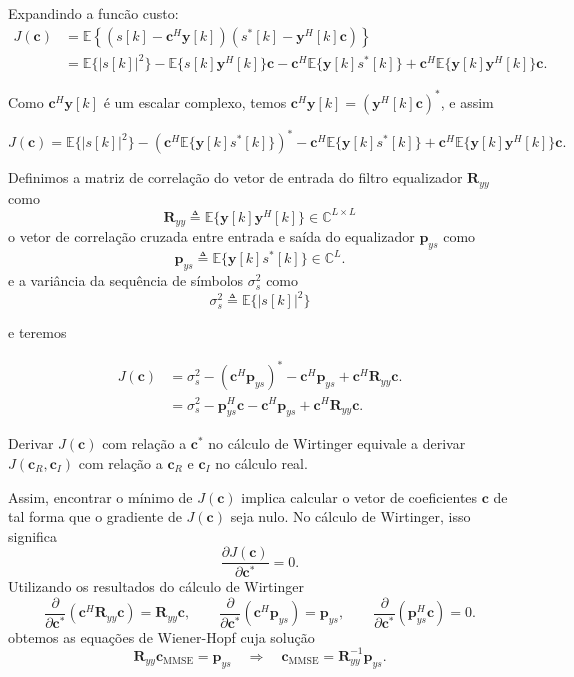 \documentclass[
  ignorenonframetext,
]{beamer}
\begin{document}
\begin{frame}
Expandindo a funcão custo: \[
\begin{aligned}
J(\mathbf{c})
 & =
\mathbb{E}\left\{
\left(s[k]-\mathbf{c}^H\mathbf{y}[k]\right)
\left(s^*[k]-\mathbf{y}^H[k]\mathbf{c}\right)
\right\}\\
&=\mathbb{E}\{|s[k]|^2\}
-
\mathbb{E}\{s[k]\mathbf{y}^H[k]\}\mathbf{c}
-
\mathbf{c}^H\mathbb{E}\{\mathbf{y}[k]s^*[k]\}
+
\mathbf{c}^H\mathbb{E}\{\mathbf{y}[k]\mathbf{y}^H[k]\}\mathbf{c}.
\end{aligned}
\]

Como \(\mathbf{c}^H\mathbf{y}[k]\) é um escalar complexo, temos
\(\mathbf{c}^H\mathbf{y}[k] = (\mathbf{y}^H[k]\mathbf{c})^*\), e assim

\[
J(\mathbf{c})
=
\mathbb{E}\{|s[k]|^2\}
-
(\mathbf{c}^H\mathbb{E}\{\mathbf{y}[k]s^*[k]\})^*
-
\mathbf{c}^H\mathbb{E}\{\mathbf{y}[k]s^*[k]\}
+
\mathbf{c}^H\mathbb{E}\{\mathbf{y}[k]\mathbf{y}^H[k]\}\mathbf{c}.
\]

Definimos a matriz de correlação do vetor de entrada do filtro
equalizador \(\mathbf{R}_{yy}\) como
\[
\mathbf{R}_{yy}\triangleq \mathbb{E}\{\mathbf{y}[k]\mathbf{y}^H[k]\}\in\mathbb{C}^{L\times L}
\]
o vetor de correlação cruzada entre entrada e saída do equalizador
\(\mathbf{p}_{ys}\) como \[
\mathbf{p}_{ys}\triangleq \mathbb{E}\{\mathbf{y}[k]s^*[k]\}\in\mathbb{C}^{L}.
\]
e a variância da sequência de símbolos \(\sigma_s^2\) como \[
\sigma_s^2 \triangleq \mathbb{E}\{|s[k]|^2\}
\]

\end{frame}

\begin{frame}
e teremos

\[
\begin{aligned}
J(\mathbf{c})
& =
\sigma_s^2
-
(\mathbf{c}^H\mathbf{p}_{ys})^*
-
\mathbf{c}^H\mathbf{p}_{ys}
+
\mathbf{c}^H\mathbf{R}_{yy}\mathbf{c}.
\\
& =
\sigma_s^2
-
\mathbf{p}_{ys}^H\mathbf{c}
-
\mathbf{c}^H\mathbf{p}_{ys}
+
\mathbf{c}^H\mathbf{R}_{yy}\mathbf{c}.
\end{aligned}
\]

Derivar \(J(\mathbf{c})\) com relação a \(\mathbf{c}^*\) no cálculo de
Wirtinger equivale a derivar \(J(\mathbf{c}_R, \mathbf{c}_I)\) com
relação a \(\mathbf{c}_R\) e \(\mathbf{c}_I\) no cálculo real.

Assim, encontrar o mínimo de \(J(\mathbf{c})\) implica calcular o vetor
de coeficientes \(\mathbf{c}\) de tal forma que o gradiente de
\(J(\mathbf{c})\) seja nulo. No cálculo de Wirtinger, isso significa
\[\frac{\partial J(\mathbf{c})}{\partial \mathbf{c^*}}=0.\]
Utilizando os resultados do cálculo de Wirtinger \[
\frac{\partial}{\partial \mathbf{c}^*}(\mathbf{c}^H\mathbf{R}_{yy}\mathbf{c})=\mathbf{R}_{yy}\mathbf{c},
\qquad
\frac{\partial}{\partial \mathbf{c}^*}(\mathbf{c}^H\mathbf{p}_{ys})=\mathbf{p}_{ys},
\qquad
\frac{\partial}{\partial \mathbf{c}^*}(\mathbf{p}_{ys}^H\mathbf{c})=0.
\]
obtemos as equações de Wiener-Hopf cuja solução
\[
\mathbf{R}_{yy}\mathbf{c}_{\text{MMSE}}=\mathbf{p}_{ys}
\quad\Longrightarrow\quad
\boxed{\mathbf{c}_{\text{MMSE}}=\mathbf{R}_{yy}^{-1}\mathbf{p}_{ys}}.
\]
\end{frame}
\end{document}
